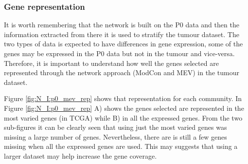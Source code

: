 \subsubsection{Gene representation}

It is worth remembering that the network is built on the P0 data and then the information extracted from there it is used to stratify the tumour dataset. The two types of data is expected to have differences in gene expression, some of the genes may be expressed in the P0 data but not in the tumour and vice-versa. Therefore, it is important to understand how well the genes selected are represented through the network approach (ModCon and MEV) in the tumour dataset. 


Figure \ref{fig:N_I:p0_mev_rep} shows that representation for each community. In Figure \ref{fig:N_I:p0_mev_rep} A) shows the genes selected are represented in the most varied genes (in TCGA) while B) in all the expressed genes. From the two sub-figures it can be clearly seen that using just the most varied genes was missing a large number of genes. Nevertheless, there are is still a few genes missing when all the expressed genes are used. This may suggests that using a larger dataset may help increase the gene coverage. 

